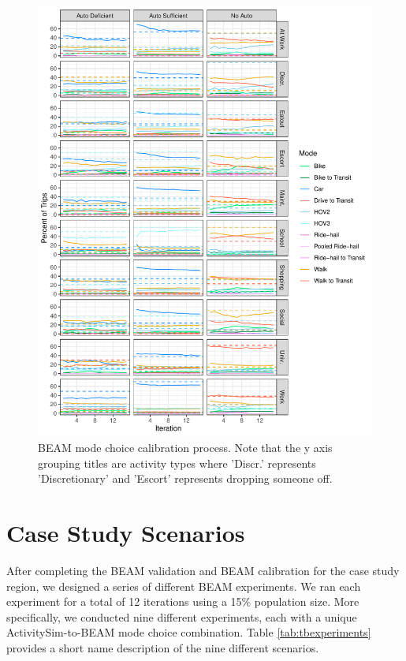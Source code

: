 \documentclass[simple, masters, twoside]{byuthesis}
\begin{document}
\begin{figure}
\includegraphics{thesis_files/figure-latex/fig-beam-calib-1} \caption[BEAM mode choice calibration process.]{BEAM mode choice calibration process. Note that the y axis grouping titles are activity types where 'Discr.' represents 'Discretionary' and 'Escort' represents dropping someone off.}\label{fig:fig-beam-calib}
\end{figure}

\hypertarget{meth-scenarios}{%
\section{Case Study Scenarios}\label{meth-scenarios}}

After completing the BEAM validation and BEAM calibration for the case study region, we designed a series of different BEAM experiments. We ran each experiment for a total of 12 iterations using a 15\% population size. More specifically, we conducted nine different experiments, each with a unique ActivitySim-to-BEAM mode choice combination. Table \ref{tab:tbexperiments} provides a short name description of the nine different scenarios.
\end{document}

